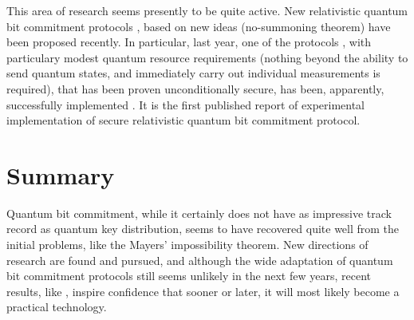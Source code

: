 \documentclass[10pt]{article}
\begin{document}

This area of research seems presently to be quite active. New relativistic quantum bit commitment
protocols \cite{Kent11}, based on new ideas (no-summoning theorem\footnotemark \cite{Kent13}) 
have been proposed recently. In particular, last year, one of the protocols \cite{Kent12}, 
with particulary modest quantum resource requirements (nothing beyond the ability to send quantum
states, and immediately carry out individual measurements is required), that has been proven 
unconditionally secure, has been, apparently, successfully implemented \cite{Lunghi14}. It is the
first published report of experimental implementation of secure relativistic quantum bit commitment 
protocol.


\section{Summary}

Quantum bit commitment, while it certainly does not have as impressive track record as quantum key
distribution, seems to have recovered quite well from the initial problems, like the Mayers'
impossibility theorem. New directions of research are found and pursued, and although the wide
adaptation of quantum bit commitment protocols still seems unlikely in the next few years, recent 
results, like \cite{Lunghi14}, inspire confidence that sooner or later, it will most likely become
a practical technology.

\nocite{*}



\end{document}

